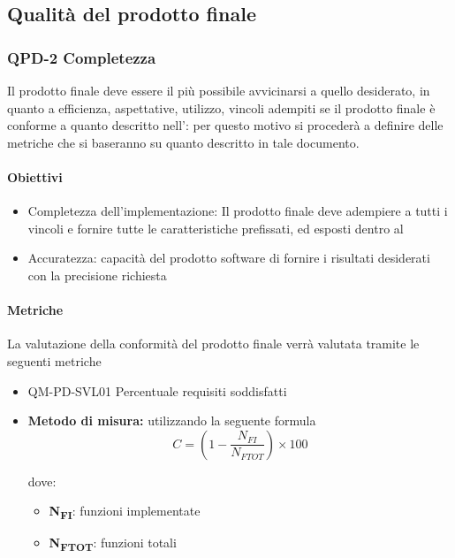 	\subsection{Qualità del prodotto finale}
	\subsubsection{QPD-2 Completezza}
	Il prodotto finale deve essere il più possibile avvicinarsi a quello desiderato, in quanto a efficienza, aspettative, utilizzo, vincoli adempiti se il prodotto finale è conforme a quanto descritto nell': per questo motivo si procederà a definire delle metriche che si baseranno su quanto descritto in tale documento.
	
		\paragraph{Obiettivi}
			\begin{itemize}
				\item{Completezza dell'implementazione:}
					Il prodotto finale deve adempiere a tutti i vincoli e fornire tutte le caratteristiche prefissati, ed esposti dentro al 
				\item{Accuratezza}: capacità del prodotto software di fornire i risultati desiderati con la precisione richiesta
			\end{itemize}
		
		\paragraph{Metriche}
			La valutazione della conformità del prodotto finale verrà valutata tramite le seguenti metriche
			\begin{itemize}
     				\item  QM-PD-SVL01  Percentuale requisiti soddisfatti
			\end{itemize}
			\begin{itemize}
				\item\textbf{Metodo di misura:} utilizzando la seguente formula
					\[ C= (1-\frac{N_{FI}}{N_{FTOT}})\times100 \]
				
					dove:
					\begin{itemize}
     						\item\textbf{N\textsubscript{FI}}: funzioni implementate
     						\item\textbf{N\textsubscript{FTOT}}: funzioni totali
					\end{itemize}
			\end{itemize}
			
